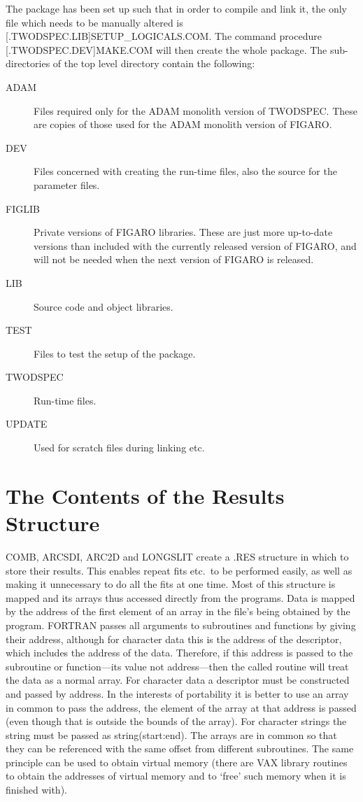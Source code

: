 The package has been set up such that in order to compile and link it,
the only file which needs to be manually altered is
[.TWODSPEC.LIB]SETUP\_LOGICALS.COM. The command procedure
[.TWODSPEC.DEV]MAKE.COM will then create the whole package.
The sub-directories of the top level directory contain the following:
\begin{description}
\item[ADAM] Files required only for the ADAM monolith version of
TWODSPEC.
These are copies of those used for the ADAM monolith version of FIGARO.
\item[DEV] Files concerned with creating the run-time files, also
the source for the parameter files.
\item[FIGLIB] Private versions of FIGARO libraries. These are just
more up-to-date versions than included with the currently released
version of FIGARO, and will not be needed when the next version of
FIGARO is released.
\item[LIB] Source code and object libraries.
\item[TEST] Files to test the setup of the package.
\item[TWODSPEC] Run-time files.
\item[UPDATE] Used for scratch files during linking etc.
\end{description}

\section{The Contents of the Results Structure}
\label{ap.res}

COMB, ARCSDI, ARC2D and LONGSLIT create a .RES structure in which to
store their results.
This enables repeat fits etc.\ to be performed easily, as well as making
it unnecessary to do all the fits at one time.
Most of this structure is mapped and its arrays thus accessed directly
from the programs.
Data is mapped by the address of the first element of an array in the
file's being obtained by the program.
FORTRAN passes all arguments to subroutines and functions by giving
their address, although for character data this is the address of the
descriptor, which includes the address of the data.
Therefore, if this address is passed to the subroutine or function---its
value not address---then the called routine will treat the data as a
normal array.
For character data a descriptor must be constructed and passed by
address.
In the interests of portability it is better to use an array in common
to pass the address, the element of the array at that address is passed
(even though that is outside the bounds of the array). For character
strings the string must be passed as string(start:end). The arrays are
in common so that they can be referenced with the same offset from
different subroutines.
The same principle can be used to obtain virtual memory
(there are VAX library routines to obtain the addresses of virtual
memory and to `free' such memory when it is finished with).

